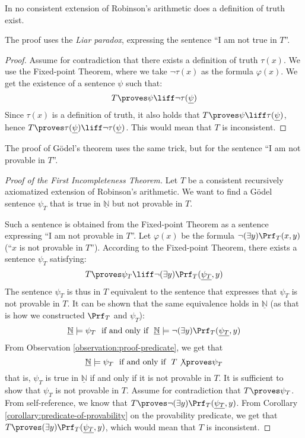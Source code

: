     \begin{theorem}
        In no consistent extension of Robinson's arithmetic does a definition of truth exist.
    \end{theorem}
    The proof uses the \emph{Liar paradox}, expressing the sentence ``I am not true in $T$''.
    \begin{proof}
    Assume for contradiction that there exists a definition of truth $\tau(x)$.
    We use the Fixed-point Theorem, where we take $\neg\tau(x)$ as the formula $\varphi(x)$. We get the existence of a sentence $\psi$ such that:
    $$
    T\proves\psi\liff\neg\tau(\underline{\psi})
    $$
    Since $\tau(x)$ is a definition of truth, it also holds that $T\proves\psi\liff\tau(\underline{\psi})$, hence $T\proves\tau(\underline{\psi})\liff\neg\tau(\underline{\psi})$. This would mean that $T$ is inconsistent.
    \end{proof}
    
    The proof of Gödel's theorem uses the same trick, but for the sentence ``I am not provable in $T$''.
    
    \begin{proof}[Proof of the First Incompleteness Theorem]
    Let $T$ be a consistent recursively axiomatized extension of Robinson's arithmetic. We want to find a Gödel sentence $\psi_T$ that is true in $\underline{\mathbb N}$ but not provable in $T$.
    
    Such a sentence is obtained from the Fixed-point Theorem as a sentence expressing ``I am not provable in $T$''. Let $\varphi(x)$ be the formula $\neg(\exists y)\Prf_T(x,y)$ (``$x$ is not provable in $T$''). According to the Fixed-point Theorem, there exists a sentence $\psi_T$ satisfying:
    $$
    T\proves\psi_T\liff\neg(\exists y)\Prf_T(\underline{\psi_T},y)
    $$
    The sentence $\psi_T$ is thus in $T$ equivalent to the sentence that expresses that $\psi_T$ is not provable in $T$. It can be shown that the same equivalence holds in $\underline{\mathbb N}$ (as that is how we constructed $\Prf_T$ and $\psi_T$):
    $$
    \underline{\mathbb N}\models\psi_T\ \text{ if and only if }\ \underline{\mathbb N}\models\neg(\exists y)\Prf_T(\underline{\psi_T},y)
    $$
    From Observation \ref{observation:proof-predicate}, we get that 
    $$
    \underline{\mathbb N}\models\psi_T\ \text{ if and only if }\ T\not\proves\psi_T
    $$
    that is, $\psi_T$ is true in $\underline{\mathbb N}$ if and only if it is not provable in $T$. It is sufficient to show that $\psi_T$ is not provable in $T$. Assume for contradiction that $T\proves\psi_T$. From self-reference, we know that 
    $T\proves\neg(\exists y)\Prf_T(\underline{\psi_T},y)$.
    From Corollary \ref{corollary:predicate-of-provability} on the provability predicate, we get that $T\proves (\exists y)\Prf_T(\underline{\psi_T},y)$, which would mean that $T$ is inconsistent.
    \end{proof}
    
